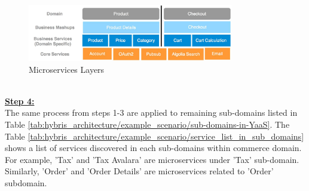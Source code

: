 \\
\begin{figure}[H]
\begin{center}
\includegraphics[width=0.8\textwidth]{figures/hybris_architecture_four}
\caption{Microservices Layers}
\label{fig:hybris_architecture/interview/microservices-layers}
\end{center}
\end{figure}
\\
\textbf{\underline{Step 4:}}
\\
The same process from steps 1-3 are applied to remaining sub-domains listed in Table \ref{tab:hybris_architecture/example_scenario/sub-domains-in-YaaS}. The Table \ref{tab:hybris_architecture/example_scenario/service_list_in_sub_domains} shows a list of services discovered in each sub-domains within commerce domain. For example, 'Tax' and 'Tax Avalara' are microservices under 'Tax' sub-domain. Similarly, 'Order' and 'Order Details' are microservices related to 'Order' subdomain.

